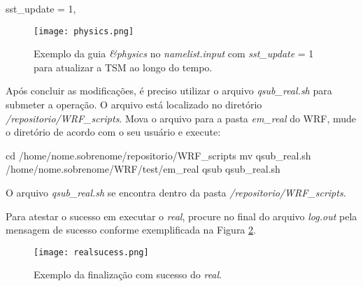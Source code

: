 \begin{bashcode}
sst_update = 1,
\end{bashcode}
\bigskip

\begin{figure}[H]
    \centering
    \texttt{[image: physics.png]}
    \caption{Exemplo da guia \textit{\&physics} no \textit{namelist.input} com \textit{sst\_update} = 1 para atualizar a TSM ao longo do tempo.}
    \label{physicsnamelist}
\end{figure}
\bigskip

\noindent Após concluir as modificações, é preciso utilizar o arquivo \textit{qsub\_real.sh} para submeter a operação. O arquivo está localizado no diretório \textit{/repositorio/WRF\_scripts}. Mova o arquivo para a pasta \textit{em\_real} do WRF, mude o diretório de acordo com o seu usuário e execute:
\bigskip

\begin{bashcode}
cd /home/nome.sobrenome/repositorio/WRF_scripts
mv qsub_real.sh /home/nome.sobrenome/WRF/test/em_real
qsub qsub_real.sh
\end{bashcode}
\bigskip

\begin{tcolorbox}[enhanced,
  grow to left by=0cm,%
  grow to right by=0cm,%
  enlarge top by=0cm,%
  enlarge bottom by=0cm,%
  tcbox raise base,
  boxrule=1.0pt,
  left=18mm,
  colframe=red!50!black,coltext=red!25!black,colback=red!10!white,
  overlay={\begin{tcbclipinterior}\fill[red!75!blue!50!white] (frame.south west)
    rectangle node[text=white,font=\sffamily\bfseries\footnotesize,rotate=0] {ATENÇÃO} ([xshift=18mm]frame.north west);\end{tcbclipinterior}}]
O arquivo \textit{qsub\_real.sh} se encontra dentro da pasta \textit{/repositorio/WRF\_scripts}.
\end{tcolorbox}
\bigskip

\noindent Para atestar o sucesso em executar o \textit{real}, procure no final do arquivo \textit{log.out} pela mensagem de sucesso conforme exemplificada na Figura \textcolor{bleu_cite}{\ref{realfinish}}.
\bigskip

\begin{figure}[H]
    \centering
    \texttt{[image: realsucess.png]}
    \caption{Exemplo da finalização com sucesso do \textit{real}.}
    \label{realfinish}
\end{figure}
\bigskip


